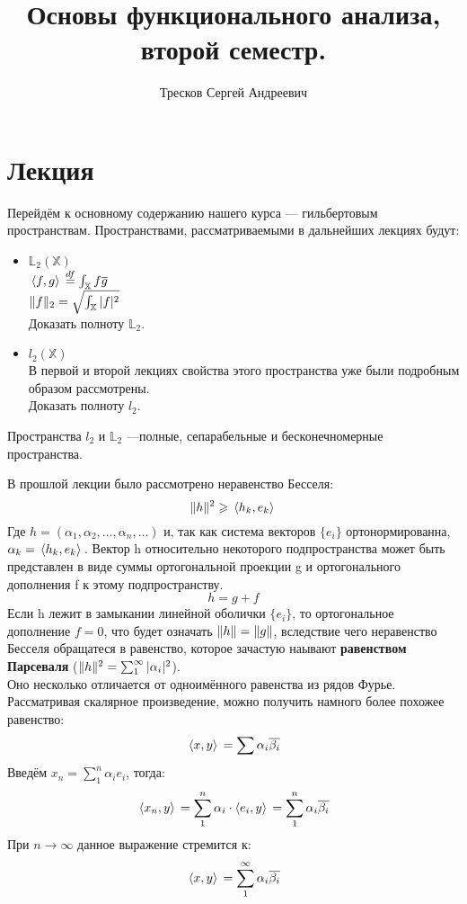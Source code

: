 \documentclass[12pt]{article}
\begin{document}
	\title{Основы функционального анализа, второй семестр.}
	\author{Тресков Сергей Андреевич}
	\maketitle
	
	\section{Лекция}
	
	Перейдём к основному содержанию нашего курса --- гильбертовым пространствам. Пространствами, рассматриваемыми 
	в дальнейших лекциях будут:
	\begin{itemize}
		\item $\mathbb{L}_2(\mathbb{X})$ \\
		$\, \langle f, g \rangle \, \overset{df}{=} \int_{\mathbb{X}} f\overline{g}$ \\
		$\| f \|_2 = \sqrt{\int_{\mathbb{X}} |f|^2}$ \\
		\exc Доказать полноту $\mathbb{L}_2$.
		
		\item $l_2(\mathbb{X})$ \\
		В первой и второй лекциях свойства этого пространства уже были подробным образом рассмотрены. \\
		\exc Доказать полноту $l_2$.
	\end{itemize}
	Пространства $l_2$ и $\mathbb{L}_2$ ---полные, сепарабельные и бесконечномерные пространства.
	
	В прошлой лекции было рассмотрено неравенство Бесселя: \\
	$$\| h \|^2 \geqslant \, \langle h_k, e_k \rangle \,$$
	Где $h = (\alpha_1, \alpha_2, \ldots, \alpha_n, \ldots)$ и, так как система векторов $\{ e_i \}$ ортонормированна, 
	$\alpha_k = \, \langle h_k, e_k \rangle \,$. Вектор h относительно некоторого подпространства может быть представлен в виде суммы
	ортогональной проекции g и ортогонального дополнения f к этому подпространству. 
	$$h = g + f$$
	Если h лежит в замыкании линейной оболички $\{ e_i \}$, то ортогональное дополнение $f = 0$, что будет означать 
	$\| h \| = \| g \|$, вследствие чего неравенство Бесселя обращатеся в равенство, которое зачастую наывают 
	\textbf{равенством Парсеваля} ($\| h \|^2 = \sum_1^{\infty} |\alpha_i|^2$).\\
	Оно несколько отличается от одноимённого равенства из рядов Фурье. Рассматривая скалярное произведение, можно получить
	намного более похожее равенство:
	$$ \, \langle x, y \rangle \, = \sum \alpha_i \overline{\beta_i} $$
	Введём $x_n = \sum_1^n \alpha_i e_i$, тогда:
	$$ \, \langle x_n, y \rangle \, = \sum_1^n \alpha_i \cdot \! \, \langle e_i, y \rangle \, = \sum_1^n \alpha_i \overline{\beta_i}$$
	При $n \rightarrow \infty$ данное выражение стремится к:
	$$ \, \langle x, y \rangle \, = \sum_1^{\infty} \alpha_i \overline{\beta_i} $$
	
\end{document}
